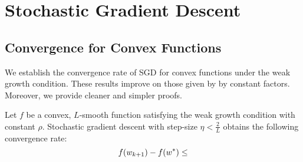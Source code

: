 
\chapter{Stochastic Gradient Descent}\label{ch:sgd}

\section{Convergence for Convex Functions}

We establish the convergence rate of SGD for convex functions under the weak growth condition. These results improve on those given by \citet{vaswani2019fast} by constant factors. 
Moreover, we provide cleaner and simpler proofs.

\begin{theorem}
    Let \( f  \) be a convex, \( L  \)-smooth function satisfying the weak growth condition with constant \( \rho  \). 
    Stochastic gradient descent with step-size \( \eta < \frac{2}{L} \) obtains the following convergence rate:
    \[ f(w_{k+1}) - f(w^*) \leq   \]
\end{theorem}

\endinput
